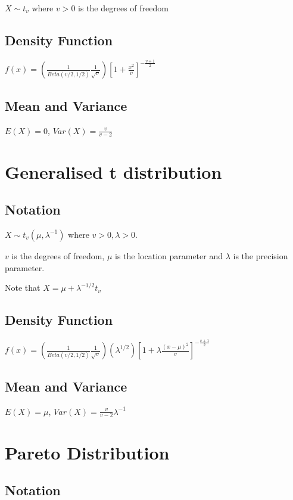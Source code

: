 \documentclass{article}
\begin{document}
\begin{multicols*}{3}
$X \sim t_{v}$ where $v > 0$ is the degrees of freedom

\subsection*{Density Function}

$f(x) = (\frac{1}{Beta(v/2, 1/2)} \frac{1}{\sqrt{v}}) [ 1 + \frac{x^{2}}{v} ]^{-\frac{v+1}{2}}$

\subsection*{Mean and Variance}

$E(X) = 0$, $Var(X) = \frac{v}{v - 2}$

\section{Generalised t distribution}
\label{sec:general-t-dist}

\subsection*{Notation}

$X \sim t_{v}(\mu, \lambda^{-1})$ where $v > 0, \lambda > 0$.

$v$ is the degrees of freedom, $\mu$ is the location parameter and $\lambda$ is the precision parameter.

Note that $X = \mu + \lambda^{-1/2} t_{v}$

\subsection*{Density Function}

$f(x) = (\frac{1}{Beta(v/2, 1/2)} \frac{1}{\sqrt{v}}) (\lambda^{1/2}) [ 1 + \lambda \frac{(x - \mu)^{2}}{v} ]^{-\frac{v+1}{2}}$

\subsection*{Mean and Variance}

$E(X) = \mu$, $Var(X) = \frac{v}{v - 2}\lambda^{-1}$


\section{Pareto Distribution}
\label{sec:pareto-dist}

\subsection*{Notation}


\end{multicols*}
\end{document}
